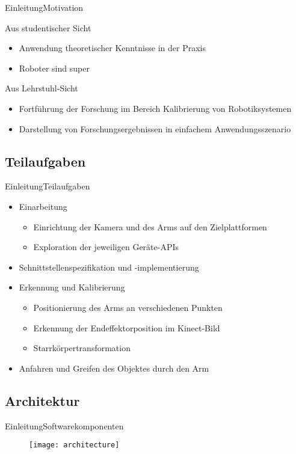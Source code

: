 \begin{frame}{Einleitung}{Motivation}
	\begin{block}{Aus studentischer Sicht}
		\begin{itemize}
			\item Anwendung theoretischer Kenntnisse in der Praxis
			\item Roboter sind super
		\end{itemize}
	\end{block}
	\begin{block}{Aus Lehrstuhl-Sicht}
		\begin{itemize}
			\item Fortführung der Forschung im Bereich Kalibrierung von
				Robotiksystemen
			\item Darstellung von Forschungsergebnissen in einfachem
				Anwendungsszenario
		\end{itemize}
	\end{block}
\end{frame}

\subsection{Teilaufgaben}

\begin{frame}{Einleitung}{Teilaufgaben}
	\begin{itemize}
		\item Einarbeitung
			\begin{itemize}
				\item Einrichtung der Kamera und des Arms auf den
					Zielplattformen %
				\item Exploration der jeweiligen Geräte-APIs
			\end{itemize}
		\item Schnittstellenspezifikation und -implementierung
		\item Erkennung und Kalibrierung
			\begin{itemize}
				\item Positionierung des Arms an verschiedenen Punkten
				\item Erkennung der Endeffektorposition im Kinect-Bild
				\item Starrkörpertransformation
			\end{itemize}
		\item Anfahren und Greifen des Objektes durch den Arm
	\end{itemize}
\end{frame}

\subsection{Architektur}

\begin{frame}[b]{Einleitung}{Softwarekomponenten}
	\begin{figure}
		\texttt{[image: architecture]}
	\end{figure}
	\vspace*{0.7cm}
\end{frame}

